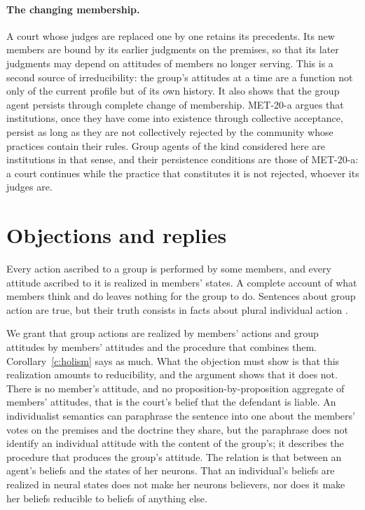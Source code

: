 \documentclass{situationist-preprint}
\begin{document}
\paragraph{The changing membership.} A court whose judges are replaced one by one retains its precedents. Its new members are bound by its earlier judgments on the premises, so that its later judgments may depend on attitudes of members no longer serving. This is a second source of irreducibility: the group's attitudes at a time are a function not only of the current profile but of its own history. It also shows that the group agent persists through complete change of membership. MET-20-a argues that institutions, once they have come into existence through collective acceptance, persist as long as they are not collectively rejected by the community whose practices contain their rules. Group agents of the kind considered here are institutions in that sense, and their persistence conditions are those of MET-20-a: a court continues while the practice that constitutes it is not rejected, whoever its judges are.

\section{Objections and replies}\label{s:objections}

\begin{objection}[Individualism]
Every action ascribed to a group is performed by some members, and every attitude ascribed to it is realized in members' states. A complete account of what members think and do leaves nothing for the group to do. Sentences about group action are true, but their truth consists in facts about plural individual action \citep{Ludwig2016}.
\end{objection}

\begin{reply}
We grant that group actions are realized by members' actions and group attitudes by members' attitudes and the procedure that combines them. Corollary~\ref{c:holism} says as much. What the objection must show is that this realization amounts to reducibility, and the argument shows that it does not. There is no member's attitude, and no proposition-by-proposition aggregate of members' attitudes, that is the court's belief that the defendant is liable. An individualist semantics can paraphrase the sentence into one about the members' votes on the premises and the doctrine they share, but the paraphrase does not identify an individual attitude with the content of the group's; it describes the procedure that produces the group's attitude. The relation is that between an agent's beliefs and the states of her neurons. That an individual's beliefs are realized in neural states does not make her neurons believers, nor does it make her beliefs reducible to beliefs of anything else.
\end{reply}
\end{document}
